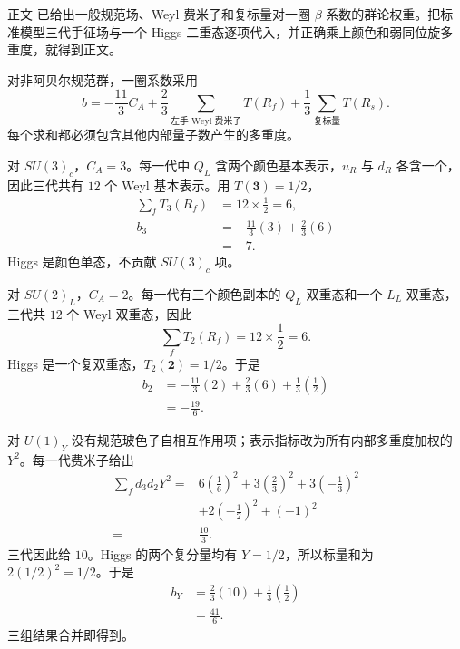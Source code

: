 \begin{derivation}[标准模型规范耦合的一圈系数]
正文 已给出一般规范场、Weyl 费米子和复标量对一圈 $\beta$ 系数的群论权重。把标准模型三代手征场与一个 Higgs 二重态逐项代入，并正确乘上颜色和弱同位旋多重度，就得到正文。

对非阿贝尔规范群，一圈系数采用
\begin{equation*}
b=-\frac{11}{3}C_A
+\frac23\sum_{\text{左手 Weyl 费米子}}T(R_f)
+\frac13\sum_{\text{复标量}}T(R_s).
\end{equation*}
每个求和都必须包含其他内部量子数产生的多重度。

对 $SU(3)_c$，$C_A=3$。每一代中 $Q_L$ 含两个颜色基本表示，$u_R$ 与 $d_R$ 各含一个，因此三代共有 $12$ 个 Weyl 基本表示。用 $T(\mathbf3)=1/2$，
\begin{align*}
\sum_fT_3(R_f)&=12\times\frac12=6,\\
b_3&=-\frac{11}{3}(3)+\frac23(6)\\
&=-7.
\end{align*}
Higgs 是颜色单态，不贡献 $SU(3)_c$ 项。

对 $SU(2)_L$，$C_A=2$。每一代有三个颜色副本的 $Q_L$ 双重态和一个 $L_L$ 双重态，三代共 $12$ 个 Weyl 双重态，因此
\begin{equation*}
\sum_fT_2(R_f)=12\times\frac12=6.
\end{equation*}
Higgs 是一个复双重态，$T_2(\mathbf2)=1/2$。于是
\begin{align*}
b_2
&=-\frac{11}{3}(2)+\frac23(6)+\frac13\left(\frac12\right)\\
&=-\frac{19}{6}.
\end{align*}

对 $U(1)_Y$ 没有规范玻色子自相互作用项；表示指标改为所有内部多重度加权的 $Y^2$。每一代费米子给出
\begin{align*}
\sum_fd_3d_2Y^2
={}&6\left(\frac16\right)^2
+3\left(\frac23\right)^2
+3\left(-\frac13\right)^2\\
&+2\left(-\frac12\right)^2+(-1)^2\\
={}&\frac{10}{3}.
\end{align*}
三代因此给 $10$。Higgs 的两个复分量均有 $Y=1/2$，所以标量和为 $2(1/2)^2=1/2$。于是
\begin{align*}
b_Y
&=\frac23(10)+\frac13\left(\frac12\right)\\
&=\frac{41}{6}.
\end{align*}
三组结果合并即得到。
\end{derivation}

